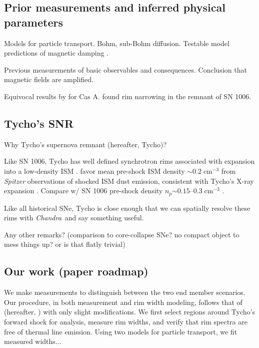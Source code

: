 \documentclass[manuscript]{aastex}  %
\newcommand{\mt}{\mathrm}
\newcommand{\unit}[1]{\;\mt{#1}}  %
\newcommand{\abt}{\mathord{\sim}} %
\newcommand{\Chandra}{\textit{Chandra}\ }
\begin{document}
\subsection{Prior measurements and inferred physical parameters}

Models for particle transport.  Bohm, sub-Bohm diffusion.
Testable model predictions of magnetic damping \citep{pohl2005}.

Previous measurements of basic observables \citep[e.g.,][]{bamba2003,
bamba2005-hist, bamba2005-vela, parizot2006} and consequences.
Conclusion that magnetic fields are amplified.

Equivocal results by \citet{araya2010} for Cas A.
\citet{ressler2014} found rim narrowing in the remnant of SN 1006.

\subsection{Tycho's SNR}
Why Tycho's supernova remnant (hereafter, Tycho)?

Like SN 1006, Tycho has well defined synchrotron rims associated with expansion
into a low-density ISM .
\citet{williams2013} favor mean pre-shock ISM density $\abt 0.2 \unit{cm^{-3}}$
from \textit{Spitzer} observations of shocked ISM dust emission,
consistent with Tycho's X-ray expansion \citep{katsuda2010}.
Compare w/ SN 1006 pre-shock density $n_p \abt 0.15$--$0.3 \unit{cm^{-3}}$
\citep{raymond2007, heng2007, winkler2013}.

Like all historical SNe, Tycho is close enough that we
can spatially resolve these rims with \Chandra and say something useful.

Any other remarks? (comparison to core-collapse SNe? no compact object to mess
things up? or is that flatly trivial)

\subsection{Our work (paper roadmap)}

We make measurements to distinguish between the two end member scenarios.
Our procedure, in both measurement and rim width modeling, follows that of
\citet{ressler2014} (hereafter, ) with only slight
modifications.
We first select regions around Tycho's forward shock for analysis, measure
rim widths, and verify that rim spectra are free of thermal line emission.
Using two models for particle transport, we fit measured widths...
\end{document}
